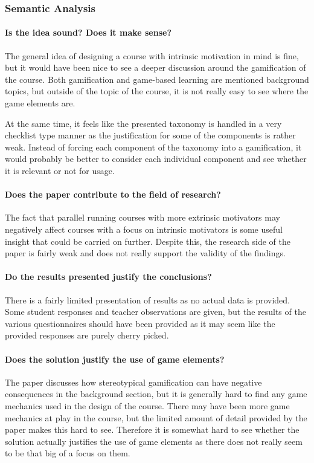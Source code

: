 \subsubsection{Semantic Analysis}
\paragraph{Is the idea sound? Does it make sense?}
The general idea of designing a course with intrinsic motivation in mind is fine, but it would have been nice to see a deeper discussion around the gamification of the course. Both gamification and game-based learning are mentioned background topics, but outside of the topic of the course, it is not really easy to see where the game elements are. 

At the same time, it feels like the presented taxonomy is handled in a very checklist type manner as the justification for some of the components is rather weak. Instead of forcing each component of the taxonomy into a gamification, it would probably be better to consider each individual component and see whether it is relevant or not for usage. 

\paragraph{Does the paper contribute to the field of research?}
The fact that parallel running courses with more extrinsic motivators may negatively affect courses with a focus on intrinsic motivators is some useful insight that could be carried on further. Despite this, the research side of the paper is fairly weak and does not really support the validity of the findings. 

\paragraph{Do the results presented justify the conclusions?} 
There is a fairly limited presentation of results as no actual data is provided. Some student responses and teacher observations are given, but the results of the various questionnaires should have been provided as it may seem like the provided responses are purely cherry picked. 

\paragraph{Does the solution justify the use of game elements?}
The paper discusses how stereotypical gamification can have negative consequences in the background section, but it is generally hard to find any game mechanics used in the design of the course. There may have been more game mechanics at play in the course, but the limited amount of detail provided by the paper makes this hard to see. Therefore it is somewhat hard to see whether the solution actually justifies the use of game elements as there does not really seem to be that big of a focus on them. 

